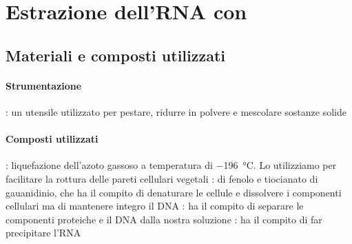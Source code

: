 \section{Estrazione dell'RNA con \trizol}
\subsection{Materiali e composti utilizzati}
\paragraph{Strumentazione}
\begin{itemize}[person]
	: un utensile utilizzato per pestare, ridurre in polvere e mescolare sostanze solide
\end{itemize}

\paragraph{Composti utilizzati}

\begingroup
{}
\begin{itemize}[person]
	: liquefazione dell'azoto gassoso a temperatura di \qty{-196}{\celsius}. Lo utilizziamo per facilitare la rottura delle pareti cellulari vegetali
	\itemb[\trizol]: \slz di fenolo e tiocianato di gauanidinio, che ha il compito di denaturare le cellule e dissolvere i componenti cellulari ma di mantenere integro il DNA
	\itemb[Cloroformio]: ha il compito di separare le componenti proteiche e il DNA dalla nostra soluzione
	\itemb[Isopropanolo]: ha il compito di far precipitare l'RNA
\end{itemize}
\endgroup

